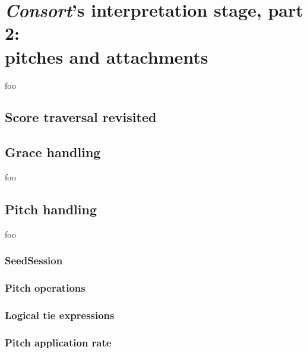\chapter[\emph{Consort}'s interpretation stage, part 2: pitches and attachments]{
    \emph{Consort}'s interpretation stage, part 2:\\ pitches and attachments}

foo

\section{Score traversal revisited}

\section{Grace handling}

foo

\section{Pitch handling}

foo

\subsection{SeedSession}

\subsection{Pitch operations}

\subsection{Logical tie expressions}

\subsection{Pitch application rate}


